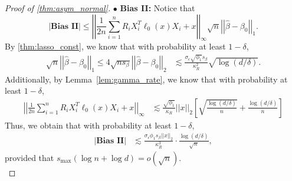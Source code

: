 \documentclass[ejsv2,noshowframe]{imsart}
\theoremstyle{plain}
\theoremstyle{definition}
\theoremstyle{remark}
\newcommand{\norm}[1]{\left|\left| #1 \right|\right|}
\renewcommand{\hat}{\widehat}
\begin{document}
\begin{proof}[Proof of \autoref{thm:asym_normal}]
	
	\noindent$\bullet$ \textbf{Bias II:} Notice that
	$$\left|\textbf{Bias II}\right| \leq \norm{\frac{1}{2n} \sum_{i=1}^n R_i X_i^T\ell_0(x) X_i +x}_{\infty} \sqrt{n}\norm{\hat{\beta} -\beta_0}_1.$$
	By \autoref{thm:lasso_const}, we know that with probability at least $1-\delta$,
	\begin{align*}
		\sqrt{n}\norm{\hat{\beta}-\beta_0}_1 \leq 4\sqrt{n s_{\beta}}\norm{\hat{\beta} - \beta_0}_2 & \lesssim \frac{\sigma_{\epsilon}\sqrt{\phi_1} s_{\beta}}{\kappa_R^2} \sqrt{\log\left(d/\delta\right)}.
	\end{align*} 
	Additionally, by Lemma~\ref{lem:gamma_rate}, we know that with probability at least $1-\delta$,
	\begin{align*}
		\norm{\frac{1}{2n} \sum_{i=1}^n R_i X_i^T\ell_0(x) X_i +x}_{\infty} &\lesssim \frac{\sqrt{\phi_1}}{\kappa_R} \norm{x}_2 \left[\sqrt{\frac{\log(d/\delta)}{n}} + \frac{\log(d/\delta)}{n} \right]
	\end{align*}
	Thus, we obtain that with probability at least $1-\delta$,
	\begin{align*}
		\left|\textbf{Bias II}\right| &\lesssim \frac{\sigma_{\epsilon}\phi_1 s_{\beta} \norm{x}_2}{\kappa_R^3} \cdot \frac{\log(d/\delta)}{\sqrt{n}},
	\end{align*}
	provided that $s_{\max}\left(\log n + \log d\right) = o(\sqrt{n})$.\\
	

\end{proof}
\end{document}
